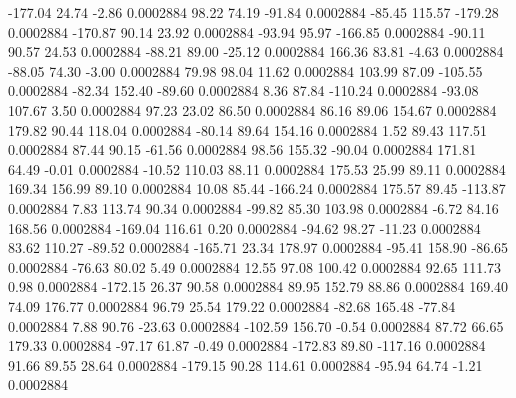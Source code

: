      -177.04       24.74       -2.86     0.0002884
       98.22       74.19      -91.84     0.0002884
      -85.45      115.57     -179.28     0.0002884
     -170.87       90.14       23.92     0.0002884
      -93.94       95.97     -166.85     0.0002884
      -90.11       90.57       24.53     0.0002884
      -88.21       89.00      -25.12     0.0002884
      166.36       83.81       -4.63     0.0002884
      -88.05       74.30       -3.00     0.0002884
       79.98       98.04       11.62     0.0002884
      103.99       87.09     -105.55     0.0002884
      -82.34      152.40      -89.60     0.0002884
        8.36       87.84     -110.24     0.0002884
      -93.08      107.67        3.50     0.0002884
       97.23       23.02       86.50     0.0002884
       86.16       89.06      154.67     0.0002884
      179.82       90.44      118.04     0.0002884
      -80.14       89.64      154.16     0.0002884
        1.52       89.43      117.51     0.0002884
       87.44       90.15      -61.56     0.0002884
       98.56      155.32      -90.04     0.0002884
      171.81       64.49       -0.01     0.0002884
      -10.52      110.03       88.11     0.0002884
      175.53       25.99       89.11     0.0002884
      169.34      156.99       89.10     0.0002884
       10.08       85.44     -166.24     0.0002884
      175.57       89.45     -113.87     0.0002884
        7.83      113.74       90.34     0.0002884
      -99.82       85.30      103.98     0.0002884
       -6.72       84.16      168.56     0.0002884
     -169.04      116.61        0.20     0.0002884
      -94.62       98.27      -11.23     0.0002884
       83.62      110.27      -89.52     0.0002884
     -165.71       23.34      178.97     0.0002884
      -95.41      158.90      -86.65     0.0002884
      -76.63       80.02        5.49     0.0002884
       12.55       97.08      100.42     0.0002884
       92.65      111.73        0.98     0.0002884
     -172.15       26.37       90.58     0.0002884
       89.95      152.79       88.86     0.0002884
      169.40       74.09      176.77     0.0002884
       96.79       25.54      179.22     0.0002884
      -82.68      165.48      -77.84     0.0002884
        7.88       90.76      -23.63     0.0002884
     -102.59      156.70       -0.54     0.0002884
       87.72       66.65      179.33     0.0002884
      -97.17       61.87       -0.49     0.0002884
     -172.83       89.80     -117.16     0.0002884
       91.66       89.55       28.64     0.0002884
     -179.15       90.28      114.61     0.0002884
      -95.94       64.74       -1.21     0.0002884
